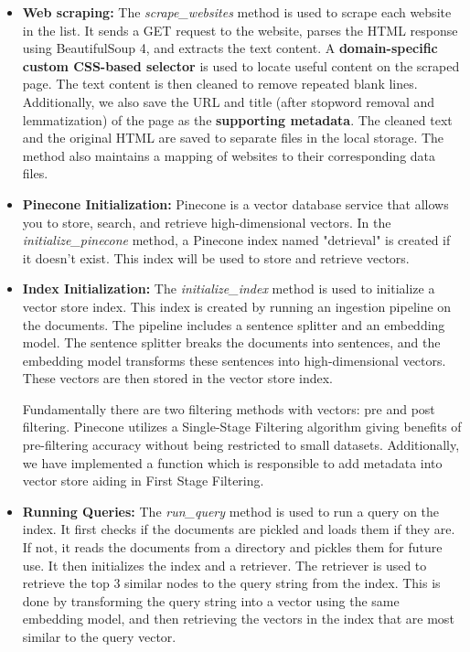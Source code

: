\documentclass[sigconf,natbib=true,anonymous=false]{acmart}
\begin{document}
\begin{itemize}

\item \textbf{Web scraping:} The \textit{scrape\_websites} method is used to scrape each website in the list. It sends a GET request to the website, parses the HTML response using BeautifulSoup 4, and extracts the text content. A \textbf{domain-specific custom CSS-based selector} is used to locate useful content on the scraped page.
\newline
\newline
The text content is then cleaned to remove repeated blank lines. Additionally, we also save the URL and title (after stopword removal and lemmatization) of the page as the \textbf{supporting metadata}. The cleaned text and the original HTML are saved to separate files in the local storage. The method also maintains a mapping of websites to their corresponding data files.

\item \textbf{Pinecone Initialization:} Pinecone is a vector database service that allows you to store, search, and retrieve high-dimensional vectors. In the \textit{initialize\_pinecone} method, a Pinecone index named "detrieval" is created if it doesn't exist. This index will be used to store and retrieve vectors.  

\item \textbf{Index Initialization:} The \textit{initialize\_index} method is used to initialize a vector store index. This index is created by running an ingestion pipeline on the documents. The pipeline includes a sentence splitter and an embedding model. The sentence splitter breaks the documents into sentences, and the embedding model transforms these sentences into high-dimensional vectors. These vectors are then stored in the vector store index. 

Fundamentally there are two filtering methods with vectors: pre and post filtering. Pinecone utilizes a Single-Stage Filtering algorithm giving benefits of pre-filtering accuracy without being restricted to small datasets. Additionally, we have implemented a function which is responsible to add metadata into vector store aiding in First Stage Filtering.

\item \textbf{Running Queries:} The \textit{run\_query} method is used to run a query on the index. It first checks if the documents are pickled and loads them if they are. If not, it reads the documents from a directory and pickles them for future use. It then initializes the index and a retriever. The retriever is used to retrieve the top 3 similar nodes to the query string from the index. This is done by transforming the query string into a vector using the same embedding model, and then retrieving the vectors in the index that are most similar to the query vector.
\end{itemize}
\end{document}

